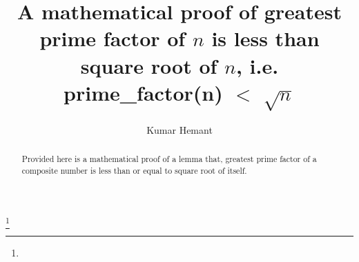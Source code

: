\documentclass[12pt]{amsproc}
\theoremstyle{definition}
\theoremstyle{remark}
\numberwithin{equation}{section}
\begin{document}
\title{\large A mathematical proof of greatest prime factor of  $n$  is less than square root of  $n$, i.e. prime\_factor(n) $<$ $\sqrt{n}$}


\author{Kumar Hemant}
\address{}
\curraddr{}
\email{}
\thanks{}



\date{}

\begin{abstract}
Provided here is a mathematical proof of a lemma that, greatest prime factor of a composite number is less than or equal to square root of itself.
\end{abstract}

\maketitle



\end{document}

